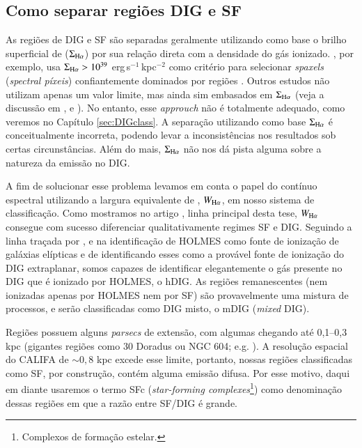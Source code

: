 \subsection{Como separar regiões DIG e SF}
\label{sec:intro:DIG:class}
As regiões de DIG e SF são separadas geralmente utilizando como base o brilho superficial de \Ha ($\Sigma_{\Ha}$) por sua relação direta com a densidade do gás ionizado. \citet{Zhang.etal.2017a}, por exemplo, usa $\Sigma_{\Ha} > 10^{39}$ erg$\,$s$^{-1}\,$kpc$^{-2}$ como critério para selecionar {\em spaxels} ({\em spectral píxeis}) confiantemente dominados por regiões \hii. Outros estudos não utilizam apenas um valor limite, mas ainda sim embasados em $\Sigma_{\Ha}$ (veja a discussão em \citealt{Zurita.etal.2000}, \citealt{Oey.etal.2007} e \citealt{Vogt.etal.2017a}). No entanto, esse {\em approuch} não é totalmente adequado, como veremos no Capítulo \ref{sec:DIGclass}. A separação utilizando como base $\Sigma_{\Ha}$ é conceitualmente incorreta, podendo levar a inconsistências nos resultados sob certas circunstâncias. Além do mais, $\Sigma_{\Ha}$ não nos dá pista alguma sobre a natureza da emissão no DIG.

A fim de solucionar esse problema levamos em conta o papel do contínuo espectral utilizando a largura equivalente de \Ha, $W_{\Ha}$, em nosso sistema de classificação. Como mostramos no artigo \citet[][Apêndice \ref{apendice:DIGpaper0}]{Lacerda.etal.2018}, linha principal desta tese, $W_{\Ha}$ consegue com sucesso diferenciar qualitativamente regimes SF e DIG. Seguindo a linha traçada por \citet{Binette.etal.1994a}, \citet{Stasinska.etal.2008a} e \citet{CidFernandes.etal.2011a} na identificação de HOLMES como fonte de ionização de galáxias elípticas e de \citet{FloresFajardo.etal.2011a} identificando esses como a provável fonte de ionização do DIG extraplanar, somos capazes de identificar elegantemente o gás presente no DIG que é ionizado por HOLMES, o hDIG. As regiões remanescentes (nem ionizadas apenas por HOLMES nem por SF) são provavelmente uma mistura de processos, e serão classificadas como DIG misto, o mDIG ({\em mixed} DIG).

Regiões \hii possuem alguns {\em parsecs} de extensão, com algumas chegando até 0,1--0,3 kpc (gigantes regiões como 30 Doradus ou NGC 604; e.g. \citealt{Rosa.y.Enrique.2000}). A resolução espacial do CALIFA de $\sim 0,8$ kpc excede esse limite, portanto, nossas regiões classificadas como SF, por construção, contém alguma emissão difusa. Por esse motivo, daqui em diante usaremos o termo SFc ({\em star-forming complexes}\footnote{Complexos de formação estelar.}) como denominação dessas regiões em que a razão entre SF/DIG é grande.


